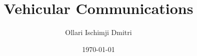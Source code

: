 \documentclass[11pt, a4paper]{article}
\begin{document}
  \title{Vehicular Communications}
  \author{Ollari Ischimji Dmitri}
  \date{\today}
  \maketitle

  \newpage
  \tableofcontents
  \newpage

  
\end{document}
